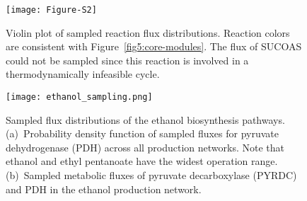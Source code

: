 \begin{figure}[!hp]
    \caption[Violin plot of sampled reaction flux distributions]{
Violin plot of sampled reaction flux distributions. Reaction colors are consistent with Figure~\ref{fig5:core-modules}. The flux of SUCOAS could not be sampled since this reaction is involved in a thermodynamically infeasible cycle.
    }
    \centering
    \texttt{[image: Figure-S2]}
    \label{fig5:fig-s2}
\end{figure}

\begin{figure}[!ht]
    \caption[Sampled flux distributions of the ethanol biosynthesis pathways]{Sampled flux distributions of the ethanol biosynthesis pathways. (a)~Probability density function of sampled fluxes for pyruvate dehydrogenase (PDH) across all production networks. Note that ethanol and ethyl pentanoate have the widest operation range. (b)~Sampled metabolic fluxes of pyruvate decarboxylase (PYRDC) and PDH in the ethanol production network.}
    \centering
    \texttt{[image: ethanol\_sampling.png]}
    \label{fig5:sampling}
\end{figure}%


